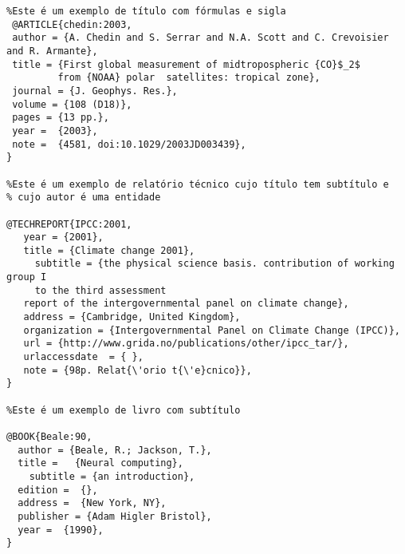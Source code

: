 \begin{verbatim}
%Este é um exemplo de título com fórmulas e sigla
 @ARTICLE{chedin:2003,
 author = {A. Chedin and S. Serrar and N.A. Scott and C. Crevoisier and R. Armante},
 title = {First global measurement of midtropospheric {CO}$_2$ 
         from {NOAA} polar	satellites: tropical zone},
 journal = {J. Geophys. Res.},
 volume = {108 (D18)},
 pages = {13 pp.},
 year =  {2003},
 note =  {4581, doi:10.1029/2003JD003439},
}

%Este é um exemplo de relatório técnico cujo título tem subtítulo e 
% cujo autor é uma entidade

@TECHREPORT{IPCC:2001,
   year = {2001},
   title = {Climate change 2001},
	 subtitle = {the physical science basis. contribution of working group I
	 to the third assessment
   report of the intergovernmental panel on climate change},
   address = {Cambridge, United Kingdom},
   organization = {Intergovernmental Panel on Climate Change (IPCC)},
   url = {http://www.grida.no/publications/other/ipcc_tar/},
   urlaccessdate  = { },  
   note = {98p. Relat{\'orio t{\'e}cnico}},
}

%Este é um exemplo de livro com subtítulo 

@BOOK{Beale:90,
  author = {Beale, R.; Jackson, T.},
  title =   {Neural computing},
	subtitle = {an introduction},
  edition =  {},
  address =  {New York, NY},
  publisher = {Adam Higler Bristol},
  year =  {1990},
}

\end{verbatim}
